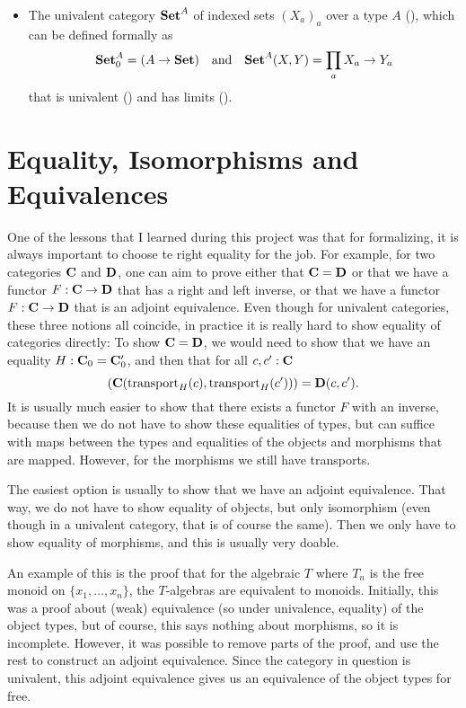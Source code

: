 \begin{itemize}
  \item The univalent category $ \mathbf{Set}^A $ of indexed sets $ (X_a)_a $ over a type $ A $ (), which can be defined formally as
  \[ \mathbf{Set}^A_0 = (A \to \mathbf{Set}) \quad \text{and} \quad \mathbf{Set}^A(X, Y) = \prod_a X_a \to Y_a \]
  that is univalent () and has limits ().
\end{itemize}

\section{Equality, Isomorphisms and Equivalences}
One of the lessons that I learned during this project was that for formalizing, it is always important to choose te right equality for the job. For example, for two categories $ \mathbf{C} $ and $ \mathbf{D} $, one can aim to prove either that $ \mathbf{C} = \mathbf{D} $ or that we have a functor $ F : \mathbf{C} \to \mathbf{D} $ that has a right and left inverse, or that we have a functor $ F : \mathbf{C} \to \mathbf{D} $ that is an adjoint equivalence. Even though for univalent categories, these three notions all coincide, in practice it is really hard to show equality of categories directly: To show $ \mathbf{C} = \mathbf{D} $, we would need to show that we have an equality $ H : \mathbf{C}_0 = \mathbf{C}_0^\prime $, and then that for all $ c, c^\prime : \mathbf{C} $
\[ (\mathbf{C}(\mathrm{transport}_H(c), \mathrm{transport}_H(c^\prime))) = \mathbf{D}(c, c^\prime). \]
It is usually much easier to show that there exists a functor $ F $ with an inverse, because then we do not have to show these equalities of types, but can suffice with maps between the types and equalities of the objects and morphisms that are mapped. However, for the morphisms we still have transports.

The easiest option is usually to show that we have an adjoint equivalence. That way, we do not have to show equality of objects, but only isomorphism (even though in a univalent category, that is of course the same). Then we only have to show equality of morphisms, and this is usually very doable.

An example of this is the proof that for the algebraic $ T $ where $ T_n $ is the free monoid on $ \{ x_1, \dots, x_n \} $, the $ T $-algebras are equivalent to monoids. Initially, this was a proof about (weak) equivalence (so under univalence, equality) of the object types, but of course, this says nothing about morphisms, so it is incomplete. However, it was possible to remove parts of the proof, and use the rest to construct an adjoint equivalence. Since the category in question is univalent, this adjoint equivalence gives us an equivalence of the object types for free.

